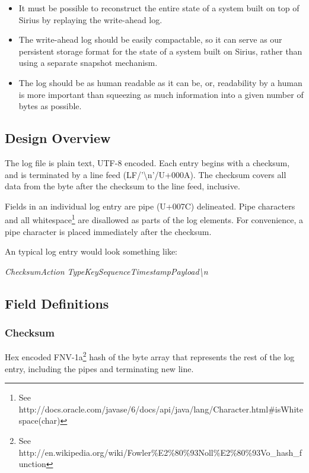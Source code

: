 \documentclass[11pt]{article}
\begin{document}
\begin{itemize}
\item It must be possible to reconstruct the entire state of a system built on top of Sirius by replaying the write-ahead log.
\item The write-ahead log should be easily compactable, so it can serve as our persistent storage format for the state of a system built on Sirius, rather than using a separate snapshot mechanism.
\item The log should be as human readable as it can be, or, readability by a human is more important than squeezing as much information into a given number of bytes as possible.
\end{itemize}


\subsection{Design Overview}

The log file is plain text, UTF-8 encoded.  Each entry begins with a checksum, and is terminated by a line feed (LF/'\textbackslash n'/U+000A). The checksum covers all data from the byte after the checksum to the line feed, inclusive.

Fields in an individual log entry are pipe (U+007C) delineated. Pipe characters and all whitespace\footnote{See http://docs.oracle.com/javase/6/docs/api/java/lang/Character.html\#isWhitespace(char)} are disallowed as parts of the log elements.  For convenience, a pipe character is placed immediately after the checksum.

An typical log entry would look something like:
\begin{center}
\em Checksum\textbar Action Type\textbar Key\textbar Sequence\textbar Timestamp\textbar Payload\textbackslash n
\end{center}


\subsection{Field Definitions}

\subsubsection{Checksum}
Hex encoded FNV-1a\footnote{See http://en.wikipedia.org/wiki/Fowler\%E2\%80\%93Noll\%E2\%80\%93Vo\_hash\_function} hash of the byte array that represents the rest of the log entry, including the pipes and terminating new line.
\end{document}
